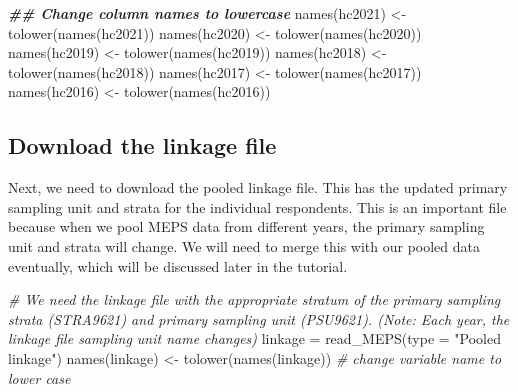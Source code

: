 \documentclass[
]{book}
\newenvironment{Shaded}{\begin{snugshade}}{\end{snugshade}}
\newcommand{\AttributeTok}[1]{\textcolor[rgb]{0.77,0.63,0.00}{#1}}
\newcommand{\CommentTok}[1]{\textcolor[rgb]{0.56,0.35,0.01}{\textit{#1}}}
\newcommand{\DocumentationTok}[1]{\textcolor[rgb]{0.56,0.35,0.01}{\textbf{\textit{#1}}}}
\newcommand{\FunctionTok}[1]{\textcolor[rgb]{0.00,0.00,0.00}{#1}}
\newcommand{\NormalTok}[1]{#1}
\newcommand{\OtherTok}[1]{\textcolor[rgb]{0.56,0.35,0.01}{#1}}
\newcommand{\StringTok}[1]{\textcolor[rgb]{0.31,0.60,0.02}{#1}}
\begin{document}
\begin{Shaded}
\begin{Highlighting}[]
\DocumentationTok{\#\# Change column names to lowercase}
\FunctionTok{names}\NormalTok{(hc2021) }\OtherTok{\textless{}{-}} \FunctionTok{tolower}\NormalTok{(}\FunctionTok{names}\NormalTok{(hc2021))}
\FunctionTok{names}\NormalTok{(hc2020) }\OtherTok{\textless{}{-}} \FunctionTok{tolower}\NormalTok{(}\FunctionTok{names}\NormalTok{(hc2020))}
\FunctionTok{names}\NormalTok{(hc2019) }\OtherTok{\textless{}{-}} \FunctionTok{tolower}\NormalTok{(}\FunctionTok{names}\NormalTok{(hc2019))}
\FunctionTok{names}\NormalTok{(hc2018) }\OtherTok{\textless{}{-}} \FunctionTok{tolower}\NormalTok{(}\FunctionTok{names}\NormalTok{(hc2018))}
\FunctionTok{names}\NormalTok{(hc2017) }\OtherTok{\textless{}{-}} \FunctionTok{tolower}\NormalTok{(}\FunctionTok{names}\NormalTok{(hc2017))}
\FunctionTok{names}\NormalTok{(hc2016) }\OtherTok{\textless{}{-}} \FunctionTok{tolower}\NormalTok{(}\FunctionTok{names}\NormalTok{(hc2016))}
\end{Highlighting}
\end{Shaded}

\hypertarget{download-the-linkage-file}{%
\subsection{Download the linkage file}\label{download-the-linkage-file}}

Next, we need to download the pooled linkage file. This has the updated primary sampling unit and strata for the individual respondents. This is an important file because when we pool MEPS data from different years, the primary sampling unit and strata will change. We will need to merge this with our pooled data eventually, which will be discussed later in the tutorial.

\begin{Shaded}
\begin{Highlighting}[]
\CommentTok{\# We need the linkage file with the appropriate stratum of the primary sampling strata (STRA9621) and primary sampling unit (PSU9621). (Note: Each year, the linkage file sampling unit name changes)}
\NormalTok{linkage }\OtherTok{=} \FunctionTok{read\_MEPS}\NormalTok{(}\AttributeTok{type =} \StringTok{"Pooled linkage"}\NormalTok{) }
\FunctionTok{names}\NormalTok{(linkage) }\OtherTok{\textless{}{-}} \FunctionTok{tolower}\NormalTok{(}\FunctionTok{names}\NormalTok{(linkage)) }\CommentTok{\# change variable name to lower case}
\end{Highlighting}
\end{Shaded}
\end{document}
